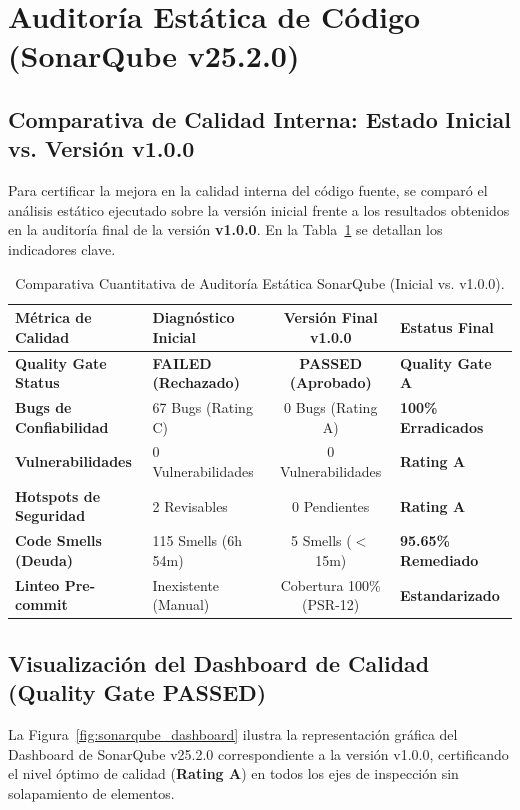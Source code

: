 \documentclass[12pt]{article}
\begin{document}
\section{Auditoría Estática de Código (SonarQube v25.2.0)}

\subsection{Comparativa de Calidad Interna: Estado Inicial vs. Versión v1.0.0}
Para certificar la mejora en la calidad interna del código fuente, se comparó el análisis estático ejecutado sobre la versión inicial frente a los resultados obtenidos en la auditoría final de la versión \textbf{v1.0.0}. En la Tabla~\ref{tab:sonarqube_comparison} se detallan los indicadores clave.

\begin{table}[H]
    \centering
    \caption{Comparativa Cuantitativa de Auditoría Estática SonarQube (Inicial vs. v1.0.0).}
    \label{tab:sonarqube_comparison}
    \small
    \color{black}
    \begin{tabularx}{\textwidth}{XXc>{\raggedright\arraybackslash}X}
        \toprule
        \textbf{Métrica de Calidad} & \textbf{Diagnóstico Inicial} & \textbf{Versión Final v1.0.0} & \textbf{Estatus Final} \\
        \midrule
        \textbf{Quality Gate Status} & \textbf{FAILED (Rechazado)} & \textbf{PASSED (Aprobado)} & \textbf{Quality Gate A} \\
        \rowcolor{darkcard}
        \textbf{Bugs de Confiabilidad} & 67 Bugs (Rating C) & 0 Bugs (Rating A) & \textbf{100\% Erradicados} \\
        \textbf{Vulnerabilidades} & 0 Vulnerabilidades & 0 Vulnerabilidades & \textbf{Rating A} \\
        \rowcolor{darkcard}
        \textbf{Hotspots de Seguridad} & 2 Revisables & 0 Pendientes & \textbf{Rating A} \\
        \textbf{Code Smells (Deuda)} & 115 Smells (6h 54m) & 5 Smells ($<$ 15m) & \textbf{95.65\% Remediado} \\
        \rowcolor{darkcard}
        \textbf{Linteo Pre-commit} & Inexistente (Manual) & Cobertura 100\% (PSR-12) & \textbf{Estandarizado} \\
        \bottomrule
    \end{tabularx}
\end{table}

\vspace{1.5em}
\subsection{Visualización del Dashboard de Calidad (Quality Gate PASSED)}
La Figura~\ref{fig:sonarqube_dashboard} ilustra la representación gráfica del Dashboard de SonarQube v25.2.0 correspondiente a la versión v1.0.0, certificando el nivel óptimo de calidad (\textbf{Rating A}) en todos los ejes de inspección sin solapamiento de elementos.
\end{document}

